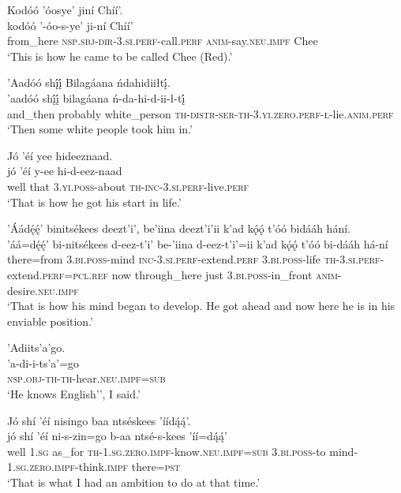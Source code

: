\ea\label{ex:text1-30-19}
Kodóó ’óosye’ jiní Chíí’.\\
\gll kodóó	’-óo-s-ye’	ji-ní	Chíí’\\
     from\_here	\textsc{nsp}.\textsc{sbj}-\textsc{dir}-3.\textsc{si}.\textsc{perf}-call.\textsc{perf}	\textsc{anim}-say.\textsc{neu}.\textsc{impf}	Chee\\
\glt `This is how he came to be called Chee (Red).'
\z

\newpage
\ea\label{ex:text1-30-20}
’Aadóó shį́į́ Bilagáana ńdahidiiłtį́.\\
\gll ’aadóó	shį́į́	bilagáana	ń-da-hi-d-ii-ł-tį́\\
     and\_then	probably	white\_person	\textsc{th}-\textsc{distr}-\textsc{ser}-\textsc{th}-3.\textsc{yi}.\textsc{zero}.\textsc{perf}-\textsc{ł}-lie.\textsc{anim}.\textsc{perf}\\
\glt `Then some white people took him in.'
\z

\ea\label{ex:text1-30-21}
Jó ’éí yee hideeznaad.\\
\gll jó	’éí	y-ee	hi-d-eez-naad\\
     well	that	3.\textsc{yi}.\textsc{poss}-about	\textsc{th}-\textsc{inc}-3.\textsc{si}.\textsc{perf}-live.\textsc{perf}\\
\glt `That is how he got his start in life.'
\z

\ea\label{ex:text1-30-22}
’Áádę́ę́’ binitsékees deezt’i’, be’iina deezt’i’ii k’ad kǫ́ǫ́ t’óó bidááh hání.\\
\gll ’áá=dę́ę́’	bi-nitsékees	d-eez-t’i’	be-’iina	d-eez-t’i’=ii	k’ad	kǫ́ǫ́	t’óó	bi-dááh	há-ní\\
     there=from	3.\textsc{bi}.\textsc{poss}-mind	\textsc{inc}-3.\textsc{si}.\textsc{perf}-extend.\textsc{perf}	3.\textsc{bi}.\textsc{poss}-life	\textsc{th}-3.\textsc{si}.\textsc{perf}-extend.\textsc{perf}=\textsc{pcl}.\textsc{ref}	now	through\_here	just	3.\textsc{bi}.\textsc{poss}-in\_front	\textsc{anim}-desire.\textsc{neu}.\textsc{impf}\\
\glt `That is how his mind began to develop. He got ahead and now here he is in his enviable position.'
\z

\ea\label{ex:text1-30-23}
’Adiits’a’go.\\
\gll ’a-di-i-ts’a’=go\\
     \textsc{nsp}.\textsc{obj}-\textsc{th}-\textsc{th}-hear.\textsc{neu}.\textsc{impf}=\textsc{sub}\\
\glt `He knows English'', I said.'
\z

\ea\label{ex:text1-30-24}
Jó shí ’éí nisingo baa ntséskees ’íídą́ą́’.\\
\gll jó	shí	’éí	ni-s-zin=go	b-aa	ntsé-s-kees	’íí=dą́ą́’\\
     well	1.\textsc{sg}	as\_for	\textsc{th}-1.\textsc{sg}.\textsc{zero}.\textsc{impf}-know.\textsc{neu}.\textsc{impf}=\textsc{sub}	3.\textsc{bi}.\textsc{poss}-to	mind-1.\textsc{sg}.\textsc{zero}.\textsc{impf}-think.\textsc{impf}	there=\textsc{pst}\\
\glt `That is what I had an ambition to do at that time.'
\z

